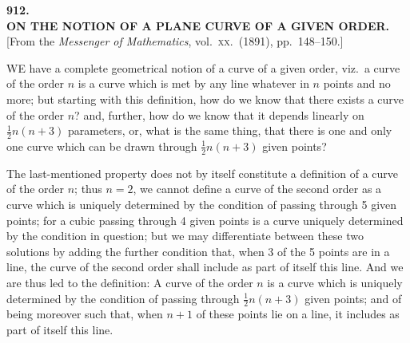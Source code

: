 \documentclass[11pt,a4paper]{article}
\begin{document}
\smallskip
{}

\clearpage

\begin{center}
{\large\bfseries 912.}\\[0.5em]
{\large\bfseries ON THE NOTION OF A PLANE CURVE OF A GIVEN ORDER.}\\[0.5em]
\small [From the \emph{Messenger of Mathematics}, vol.\ \textsc{xx}.\ (1891), pp.\ 148--150.]
\end{center}
\medskip

\noindent WE have a complete geometrical notion of a curve of a given order, viz.\ a curve of the order $n$ is a curve which is met by any line whatever in $n$ points and no more; but starting with this definition, how do we know that there exists a curve of the order $n$? and, further, how do we know that it depends linearly on $\tfrac{1}{2} n (n + 3)$ parameters, or, what is the same thing, that there is one and only one curve which can be drawn through $\tfrac{1}{2} n (n + 3)$ given points?

The last-mentioned property does not by itself constitute a definition of a curve of the order $n$; thus $n = 2$, we cannot define a curve of the second order as a curve which is uniquely determined by the condition of passing through 5 given points; for a cubic passing through 4 given points is a curve uniquely determined by the condition in question; but we may differentiate between these two solutions by adding the further condition that, when 3 of the 5 points are in a line, the curve of the second order shall include as part of itself this line. And we are thus led to the definition: A curve of the order $n$ is a curve which is uniquely determined by the condition of passing through $\tfrac{1}{2} n (n + 3)$ given points; and of being moreover such that, when $n + 1$ of these points lie on a line, it includes as part of itself this line.
\end{document}

